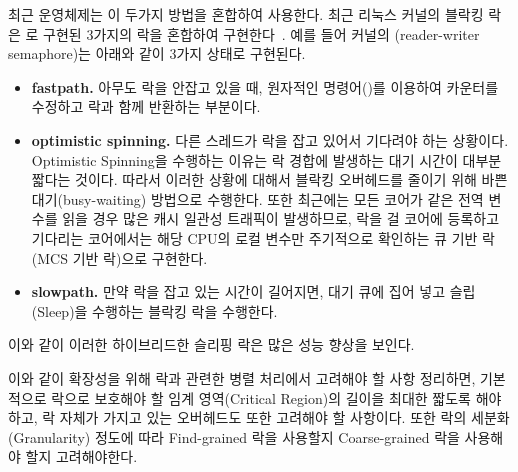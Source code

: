 최근 운영체제는 이 두가지 방법을 혼합하여 사용한다. 
최근 리눅스 커널의 블락킹 락은 로 구현된 3가지의
락을 혼합하여 구현한다~\cite{Bueso2014STP}.
예를 들어 커널의 (reader-writer semaphore)는 아래와 같이 3가지 상태로 구현된다.
\begin{itemize}
\item \textbf{fastpath.} 아무도 락을 안잡고 있을 때, 원자적인 명령어()를 이용하여
카운터를 수정하고 락과 함께 반환하는 부분이다.
\item \textbf{optimistic spinning.} 다른 스레드가 락을 잡고 있어서 기다려야 하는 상황이다.
Optimistic Spinning을 수행하는 이유는 락 경합에 발생하는 대기 시간이 대부분 짧다는 것이다.
따라서 이러한 상황에 대해서 블락킹 오버헤드를 줄이기 위해 바쁜대기(busy-waiting) 방법으로 수행한다. 
또한 최근에는 모든 코어가 같은 전역 변수를 읽을 경우 많은 캐시 일관성 트래픽이 발생하므로, 
락을 걸 코어에 등록하고 기다리는 코어에서는 해당 CPU의 로컬 변수만 주기적으로 확인하는 
큐 기반 락(MCS 기반 락)으로 구현한다. 
\item \textbf{slowpath.} 만약 락을 잡고 있는 시간이 길어지면, 대기 큐에 집어 넣고 슬립(Sleep)을 수행하는 블락킹 
락을 수행한다. 
\end{itemize}
이와 같이 이러한 하이브리드한 슬리핑 락은 많은 성능 향상을 보인다. 







이와 같이 확장성을 위해 락과 관련한 병렬 처리에서 고려해야 할 사항 정리하면,
기본적으로 락으로 보호해야 할 임계 영역(Critical Region)의 길이을 최대한 짧도록 해야하고, 
락 자체가 가지고 있는 오버헤드도 또한 고려해야 할 사항이다. 
또한 락의 세분화(Granularity) 정도에 따라 Find-grained 락을 사용할지 Coarse-grained 락을 사용해야 할지 
고려해야한다.

